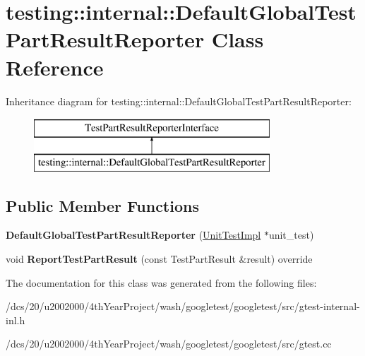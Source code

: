 \hypertarget{classtesting_1_1internal_1_1DefaultGlobalTestPartResultReporter}{}\section{testing\+:\+:internal\+:\+:Default\+Global\+Test\+Part\+Result\+Reporter Class Reference}
\label{classtesting_1_1internal_1_1DefaultGlobalTestPartResultReporter}
Inheritance diagram for testing\+:\+:internal\+:\+:Default\+Global\+Test\+Part\+Result\+Reporter\+:\begin{figure}[H]
\begin{center}
\leavevmode
\includegraphics[height=2.000000cm]{classtesting_1_1internal_1_1DefaultGlobalTestPartResultReporter}
\end{center}
\end{figure}
\subsection*{Public Member Functions}
\begin{DoxyCompactItemize}
\item 
\mbox{\label{classtesting_1_1internal_1_1DefaultGlobalTestPartResultReporter_a3900ea7f34b34afd48c7d1d0312a1488}} 
{\bfseries Default\+Global\+Test\+Part\+Result\+Reporter} (\mbox{\hyperlink{classtesting_1_1internal_1_1UnitTestImpl}{Unit\+Test\+Impl}} $\ast$unit\+\_\+test)
\item 
\mbox{\label{classtesting_1_1internal_1_1DefaultGlobalTestPartResultReporter_a4e0d1f9cf7a977ca1fa37b90e1d03ca7}} 
void {\bfseries Report\+Test\+Part\+Result} (const Test\+Part\+Result \&result) override
\end{DoxyCompactItemize}


The documentation for this class was generated from the following files\+:\begin{DoxyCompactItemize}
\item 
/dcs/20/u2002000/4th\+Year\+Project/wash/googletest/googletest/src/gtest-\/internal-\/inl.\+h\item 
/dcs/20/u2002000/4th\+Year\+Project/wash/googletest/googletest/src/gtest.\+cc\end{DoxyCompactItemize}
